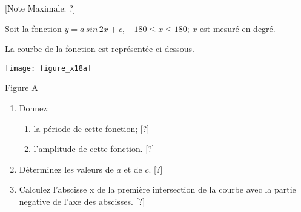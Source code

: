 \begin{question}
  \hspace*{\fill} [Note Maximale: ?]\par
  \noindent Soit la fonction $y = a\,sin\,2x + c$, $-180 \le x \le 180$; $x$ est mesuré en degré.\par
  \medskip
  \begin{center} %
    \noindent La courbe de la fonction est représentée ci-dessous.\par
    \texttt{[image: figure\_x18a]}\par
    \noindent Figure A\par
  \end{center} %

  \begin{enumerate}[label=(\alph*)]
    \item Donnez:
      \begin{enumerate}[label=(\roman*)]
        \item la période de cette fonction;\hspace*{\fill} [?] %
        \item l'amplitude de cette fonction.\hspace*{\fill} [?]
      \end{enumerate}
    \item Déterminez les valeurs de $a$ et de $c$.\hspace*{\fill} [?]
    \item Calculez l'abscisse x de la première intersection de la courbe avec la partie negative de l'axe
des abscisses.\hspace*{\fill} [?]
  \end{enumerate}
\end{question}
